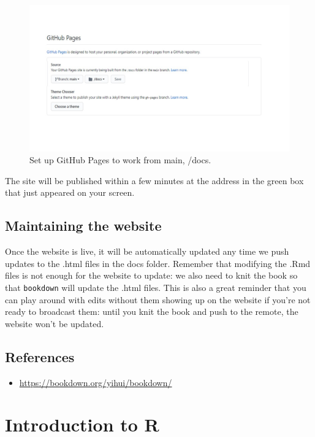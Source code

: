 \documentclass[
]{book}
\providecommand{\tightlist}{%
  \setlength{\itemsep}{0pt}\setlength{\parskip}{0pt}}
\begin{document}
\begin{figure}
\centering
\includegraphics{img/github-pages-main-docs.jpg}
\caption{Set up GitHub Pages to work from main, /docs.}
\end{figure}

The site will be published within a few minutes at the address in the green box that just appeared on your screen.

\hypertarget{maintaining-the-website}{%
\section{Maintaining the website}\label{maintaining-the-website}}

Once the website is live, it will be automatically updated any time we push updates to the .html files in the docs folder. Remember that modifying the .Rmd files is not enough for the website to update: we also need to knit the book so that \texttt{bookdown} will update the .html files. This is also a great reminder that you can play around with edits without them showing up on the website if you're not ready to broadcast them: until you knit the book and push to the remote, the website won't be updated.

\hypertarget{references-4}{%
\section{References}\label{references-4}}

\begin{itemize}
\tightlist
\item
  \url{https://bookdown.org/yihui/bookdown/}
\end{itemize}

\hypertarget{intro-to-r}{%
\chapter{Introduction to R}\label{intro-to-r}}
\end{document}

